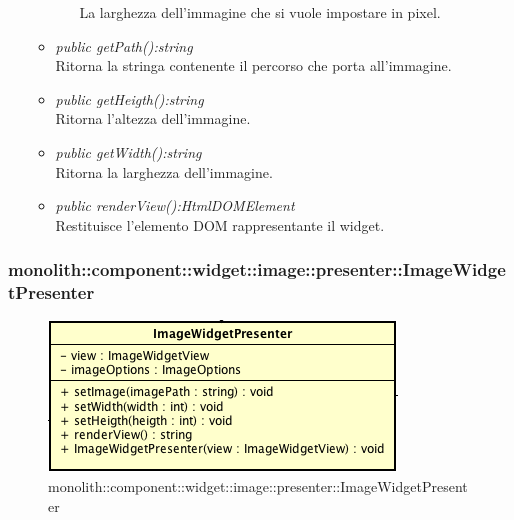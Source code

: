 \begin{itemize}
\begin{itemize}
\begin{itemize}
		La larghezza dell'immagine che si vuole impostare in pixel.
		\end{itemize} 
	\item \textit{public getPath():string}\\
	Ritorna la stringa contenente il percorso che porta all'immagine.
	\item \textit{public getHeigth():string}\\
	Ritorna l'altezza dell'immagine.
	\item \textit{public getWidth():string}\\
	Ritorna la larghezza dell'immagine.
	\item \textit{public renderView():HtmlDOMElement}\\
	Restituisce l'elemento DOM rappresentante il widget.
	\end{itemize}
\end{itemize}

\subsubsection{monolith::component::widget::image::presenter::ImageWidgetPresenter}

\label{monolith::component::widget::image::presenter::ImageWidgetPresenter}
\begin{figure}[H]
	\centering
	\includegraphics[scale=0.5]{Sezioni/SottosezioniST/img/ImageWidgetPresenter.png}
	\caption{monolith::component::widget::image::presenter::ImageWidgetPresenter}
\end{figure}

